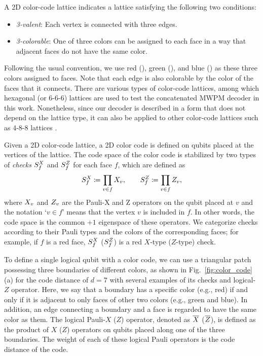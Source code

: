 \documentclass[a4paper,twocolumn,11pt,accepted=2025-01-21]{quantumarticle}
\theoremstyle{definition}
\theoremstyle{definition}
\theoremstyle{definition}
\begin{document}
A 2D color-code lattice indicates a lattice satisfying the following two conditions:
\begin{itemize}
    \item \textit{3-valent}: Each vertex is connected with three edges.
    \item \textit{3-colorable}: One of three colors can be assigned to each face in a way that adjacent faces do not have the same color.
\end{itemize}
Following the usual convention, we use red (\rbs), green (\gbs), and blue (\bbs) as these three colors assigned to faces.
Note that each edge is also colorable by the color of the faces that it connects.
There are various types of color-code lattices, among which hexagonal (or 6-6-6) lattices are used to test the concatenated MWPM decoder in this work.
Nonetheless, since our decoder is described in a form that does not depend on the lattice type, it can also be applied to other color-code lattices such as 4-8-8 lattices \cite{fowler2011twodimensional}.

Given a 2D color-code lattice, a 2D color code \cite{bombin2006topological} is defined on qubits placed at the vertices of the lattice.
The code space of the color code is stabilized by two types of \emph{checks} $S_{f}^X$ and $S_{f}^Z$ for each face $f$, which are defined as
\begin{align}
    S_{f}^X \coloneqq \prod_{v \in f} X_{v}, \qquad S_{f}^Z \coloneqq \prod_{v \in f} Z_{v}, \label{eq:checks_def}
\end{align}
where $X_{v}$ and $Z_{v}$ are the Pauli-X and Z operators on the qubit placed at $v$ and the notation `$v \in f$' means that the vertex $v$ is included in $f$.
In other words, the code space is the common $+1$ eigenspace of these operators.
We categorize checks according to their Pauli types and the colors of the corresponding faces; for example, if $f$ is a red face, $S_{f}^X$ ($S_{f}^Z$) is a red $X$-type ($Z$-type) check.

To define a single logical qubit with a color code, we can use a triangular patch possessing three boundaries of different colors, as shown in Fig.~\ref{fig:color_code}(a) for the code distance of $d=7$ with several examples of its checks and logical-$Z$ operator.
Here, we say that a boundary has a specific color (e.g., red) if and only if it is adjacent to only faces of other two colors (e.g., green and blue).
In addition, an edge connecting a boundary and a face is regarded to have the same color as them.
The logical Pauli-$X$ ($Z$) operator, denoted as $\overline{X}$ ($\overline{Z}$), is defined as the product of $X$ ($Z$) operators on qubits placed along one of the three boundaries.
The weight of each of these logical Pauli operators is the code distance of the code.
\end{document}
